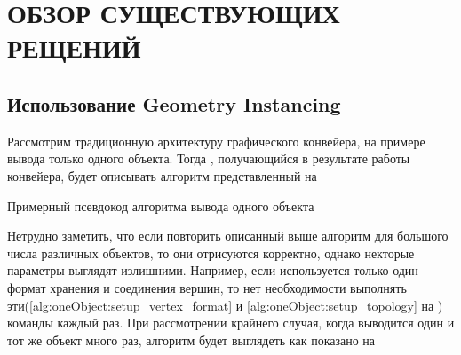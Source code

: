 \chapter{ОБЗОР СУЩЕСТВУЮЩИХ РЕЩЕНИЙ} \label{ch2}
\section{Использование Geometry Instancing} \label{ch2:instancing} %
	Рассмотрим традиционную архитектуру графического конвейера, на примере вывода только одного объекта. Тогда , получающийся в результате работы конвейера, будет описывать алгоритм представленный на 
	\begin{algorithm} %
		\nonl{}
		\caption{Примерный псевдокод алгоритма вывода одного объекта}\label{alg:oneObject}
	\end{algorithm}
	\FloatBarrier
	
	Нетрудно заметить, что если повторить описанный выше алгоритм для большого числа различных объектов, то они отрисуются корректно, однако некторые параметры выглядят излишними. Например, если используется только один формат хранения и соединения вершин, то нет необходимости выполнять эти(\ref{alg:oneObject:setup_vertex_format} и  \ref{alg:oneObject:setup_topology} на ) команды каждый раз. При рассмотрении крайнего случая, когда выводится один и тот же объект много раз, алгоритм будет выглядеть как показано на 
	
